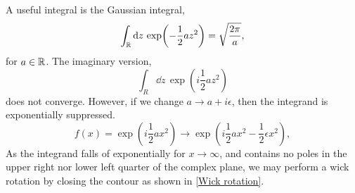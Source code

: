 A useful integral is the Gaussian integral,
\begin{equation}
    \int_{\mathbb{R}} \dd z \, \exp(- \frac{1}{2} a z^2) = \sqrt{\frac{2 \pi}{a}},
\end{equation}
for $a \in \mathbb{R}$. The imaginary version,
\begin{equation}
    \int_R \dd z \, \exp(i \frac{1}{2} a z^2 )
\end{equation}
does not converge. However, if we change $a \rightarrow a + i\epsilon$, 
then the integrand is exponentially suppressed.
\begin{equation}
    f(x) = \exp(i \frac{1}{2}a x^2) \rightarrow
    \exp(i\frac{1}{2}a x^2 - \frac{1}{2} \epsilon  x^2),
\end{equation}
As the integrand falls of exponentially for $x\rightarrow \infty$, and contains no poles in the upper right nor lower left quarter of the complex plane, we may perform a wick rotation by closing the contour as shown in \autoref{Wick rotation}.
